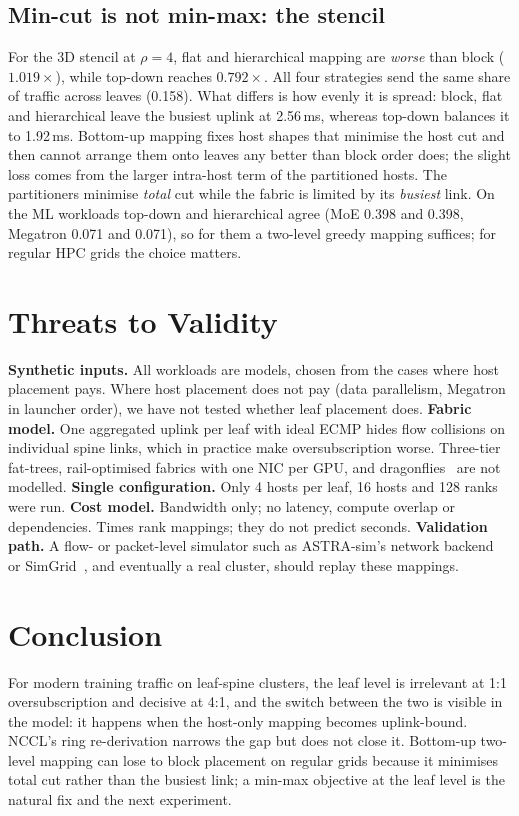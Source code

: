 \documentclass[conference]{IEEEtran}
\begin{document}
\subsection{Min-cut is not min-max: the stencil}
For the 3D stencil at $\rho=4$, flat and hierarchical mapping are \emph{worse} than block
($1.019\times$), while top-down reaches $0.792\times$. All four strategies send the same share of
traffic across leaves (0.158). What differs is how evenly it is spread: block, flat and hierarchical
leave the busiest uplink at 2.56\,ms, whereas top-down balances it to 1.92\,ms. Bottom-up mapping
fixes host shapes that minimise the host cut and then cannot arrange them onto leaves any better
than block order does; the slight loss comes from the larger intra-host term of the partitioned
hosts. The partitioners minimise \emph{total} cut while the fabric is limited by its \emph{busiest}
link. On the ML workloads top-down and hierarchical agree (MoE 0.398 and 0.398, Megatron 0.071 and
0.071), so for them a two-level greedy mapping suffices; for regular HPC grids the choice matters.

\section{Threats to Validity}

\textbf{Synthetic inputs.} All workloads are models, chosen from the cases where host placement
pays. Where host placement does not pay (data parallelism, Megatron in launcher order), we have not
tested whether leaf placement does.
\textbf{Fabric model.} One aggregated uplink per leaf with ideal ECMP hides flow collisions on
individual spine links, which in practice make oversubscription worse. Three-tier fat-trees,
rail-optimised fabrics with one NIC per GPU, and dragonflies~\cite{kim2008dragonfly} are not modelled.
\textbf{Single configuration.} Only 4 hosts per leaf, 16 hosts and 128 ranks were run.
\textbf{Cost model.} Bandwidth only; no latency, compute overlap or dependencies. Times rank
mappings; they do not predict seconds.
\textbf{Validation path.} A flow- or packet-level simulator such as ASTRA-sim's network
backend~\cite{rashidi2020astra} or SimGrid~\cite{casanova2014simgrid}, and eventually a real
cluster, should replay these mappings.

\section{Conclusion}
For modern training traffic on leaf-spine clusters, the leaf level is irrelevant at 1:1
oversubscription and decisive at 4:1, and the switch between the two is visible in the model: it
happens when the host-only mapping becomes uplink-bound. NCCL's ring re-derivation narrows the gap
but does not close it. Bottom-up two-level mapping can lose to block placement on regular grids
because it minimises total cut rather than the busiest link; a min-max objective at the leaf level
is the natural fix and the next experiment.
\end{document}
